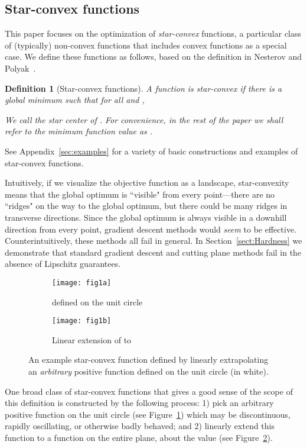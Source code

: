 \documentclass[11pt,letter]{article}
\newcounter{nTheorems}
\numberwithin{nTheorems}{section}
\newtheorem{definition}[nTheorems]{Definition}
\begin{document}
\subsection{Star-convex functions}
This paper focuses on the optimization of \emph{star-convex} functions, a particular class of (typically) non-convex functions that includes convex functions as a special case.
We define these functions as follows, based on the definition in Nesterov and Polyak~\cite{Nesterov:2006}.

\begin{definition}[Star-convex functions]
A function  is \emph{star-convex} if there is a global minimum  such that for all  and ,

We call  the star center of .
For convenience, in the rest of the paper we shall refer to the minimum function value as .
\end{definition}

See Appendix~\ref{sec:examples} for a variety of basic constructions and examples of star-convex functions.

Intuitively, if we visualize the objective function as a landscape, star-convexity means that the global optimum is ``visible" from every point---there are no ``ridges" on the way to the global optimum, but there could be many ridges in transverse directions. Since the global optimum is always visible in a downhill direction from every point, gradient descent methods would \emph{seem} to be effective.
Counterintuitively, these methods all fail in general. In Section~\ref{sect:Hardness} we demonstrate that standard gradient descent and cutting plane methods fail in the absence of Lipschitz guarantees.

\begin{figure}
\centering
\begin{subfigure}[b]{.45\textwidth}
\centering
\texttt{[image: fig1a]}
\caption{ defined on the unit circle}
\label{Fig:fig1a}
\end{subfigure}
\quad
\begin{subfigure}[b]{.45\textwidth}
\centering
\texttt{[image: fig1b]}
\caption{Linear extension of  to }
\label{Fig:fig1b}
\end{subfigure}
\caption{An example star-convex function  defined by linearly extrapolating an \emph{arbitrary} positive function  defined on the unit circle (in white).}
\label{Fig:fig1}
\end{figure}


One broad class of star-convex functions that gives a good sense of the scope of this definition is constructed by the following process: 1) pick an arbitrary positive function  on the unit circle (see Figure~\ref{Fig:fig1a}) which may be discontinuous, rapidly oscillating, or otherwise badly behaved; and 2) linearly extend this function to a function  on the entire plane, about the value  (see Figure~\ref{Fig:fig1b}).
\end{document}
